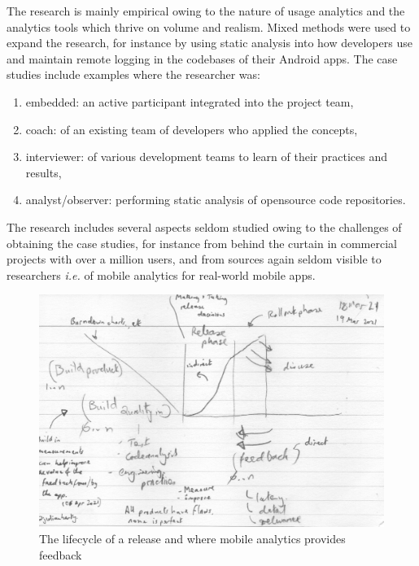 
The research is mainly empirical owing to the nature of usage analytics and the analytics tools which thrive on volume and realism. Mixed methods were used to expand the research, for instance by using static analysis into how developers use and maintain remote logging in the codebases of their Android apps. The case studies include examples where the researcher was:
\begin{enumerate}
    \item embedded: an active participant integrated into the project team,
    \item coach: of an existing team of developers who applied the concepts,
    \item interviewer: of various development teams to learn of their practices and results,
    \item analyst/observer: performing static analysis of opensource code repositories.
\end{enumerate}

The research includes several aspects seldom studied owing to the challenges of obtaining the case studies, for instance from behind the curtain in commercial projects with over a million users, and from sources again seldom visible to researchers \emph{i.e.} of mobile analytics for real-world mobile apps.

\newpage

\begin{figure}
    \centering
    \includegraphics[width=15cm]{images/rough-sketches/Red-Thread-Rough-Sketch.jpeg}
    \caption{The lifecycle of a release and where mobile analytics provides feedback}
    \label{fig:red-thread-for-this-thesis}
\end{figure}

